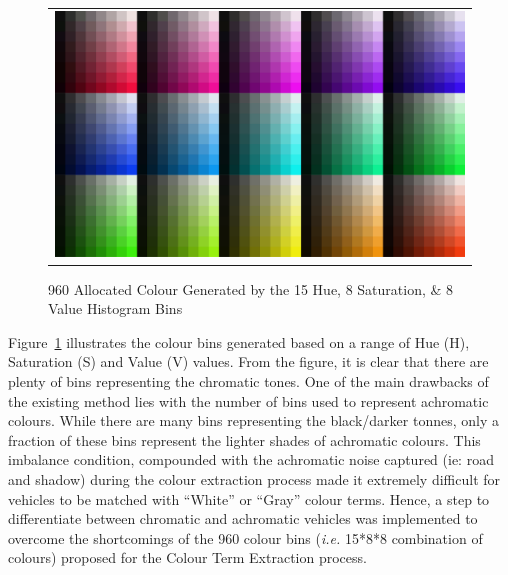 \begin{figure}[htb!]
  \centering
\begin{tabular}{c}
 \includegraphics[width=0.7\linewidth]{image/retrievalOne/all.png} \\
\end{tabular}
    \caption{960 Allocated Colour Generated by the 15 Hue, 8 Saturation, \& 8 Value Histogram Bins} \label{fig:hsvAllocated}
\end{figure}

Figure~\ref{fig:hsvAllocated} illustrates the colour bins generated based on a range of Hue (H), Saturation (S) and Value (V) values. From the figure, it is clear that there are plenty of bins representing the chromatic tones.
One of the main drawbacks of the existing method lies with the number of bins used to represent achromatic colours.
While there are many bins representing the black/darker tonnes, only a fraction of these bins represent the lighter shades of achromatic colours. This imbalance condition, compounded with the achromatic noise captured (ie: road and shadow) during the colour extraction process made it extremely difficult for vehicles to be matched with ``White'' or ``Gray'' colour terms.
Hence, a step to differentiate between chromatic and achromatic vehicles was implemented to overcome the shortcomings of the 960 colour bins (\emph{i.e.} 15*8*8 combination of colours) proposed for the Colour Term Extraction process. %

